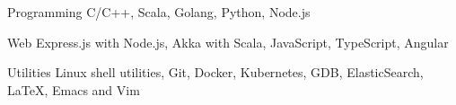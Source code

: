
\vspace{-0.3cm}


\begin{cvskills}


  \cvskill
  {Programming}
  {C/C++, Scala, Golang, Python, Node.js}


  \cvskill
  {Web}
  {Express.js with Node.js, Akka with Scala, JavaScript, TypeScript, Angular}



  \cvskill
  {Utilities}
  {Linux shell utilities, Git, Docker,
    Kubernetes, GDB, ElasticSearch, \LaTeX, Emacs and Vim}


\end{cvskills}

